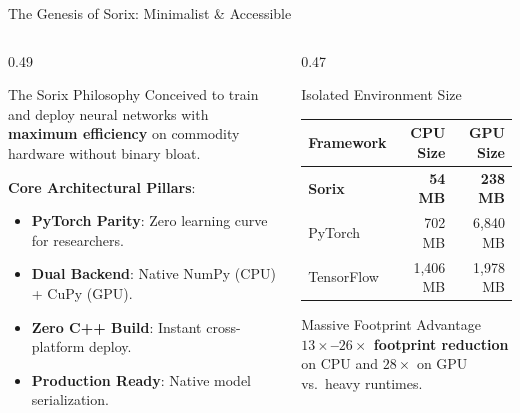 \documentclass[11pt,aspectratio=169]{beamer}
\begin{document}
\begin{frame}{The Genesis of Sorix: Minimalist \& Accessible}
  \begin{columns}[T,onlytextwidth]
    \begin{column}{0.49\textwidth}
      \begin{block}{The Sorix Philosophy}
        Conceived to train and deploy neural networks with \textbf{maximum efficiency} on commodity hardware without binary bloat.
        \vspace{0.25em}
        
        \textbf{Core Architectural Pillars}:
        \begin{itemize}
          \setlength{\itemsep}{0.08em}
          \item \textbf{PyTorch Parity}: Zero learning curve for researchers.
          \item \textbf{Dual Backend}: Native NumPy (CPU) + CuPy (GPU).
          \item \textbf{Zero C++ Build}: Instant cross-platform deploy.
          \item \textbf{Production Ready}: Native model serialization.
        \end{itemize}
      \end{block}
    \end{column}

    \begin{column}{0.47\textwidth}
      \begin{exampleblock}{Isolated Environment Size}
        \centering
        \scriptsize
        \begin{tabular}{lrr}
          \toprule
          \textbf{Framework} & \textbf{CPU Size} & \textbf{GPU Size} \\
          \midrule
          \rowcolor{cvlightblue!35}
          \textbf{Sorix} & \textbf{54 MB} & \textbf{238 MB} \\
          PyTorch & 702 MB & 6{,}840 MB \\
          TensorFlow & 1{,}406 MB & 1{,}978 MB \\
          \bottomrule
        \end{tabular}
      \end{exampleblock}
      \vspace{-0.4em}
      \begin{alertblock}{Massive Footprint Advantage}
        \footnotesize \textbf{$13\times$--$26\times$ footprint reduction} on CPU and \textbf{$28\times$} on GPU vs.\ heavy runtimes.
      \end{alertblock}
    \end{column}
  \end{columns}
\end{frame}
\end{document}
